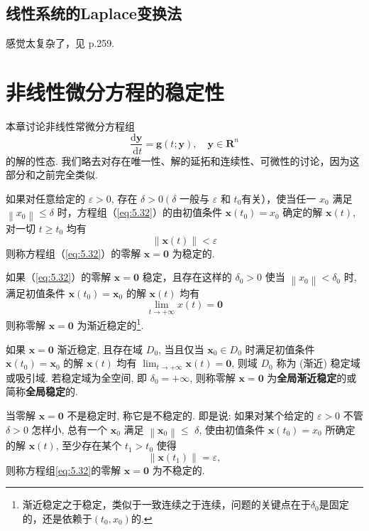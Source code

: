 \subsection{线性系统的Laplace变换法}

感觉太复杂了，见\cite{王高雄} p.259.

\section{非线性微分方程的稳定性}

本章讨论非线性常微分方程组
\begin{equation}\label{eq:5.32}
    \frac{\mathrm{d} \boldsymbol{y}}{\mathrm{~d} t}=\boldsymbol{g}(t ; \boldsymbol{y}), \quad \boldsymbol{y} \in \mathbf{R}^n
\end{equation}
的解的性态. 我们略去对存在唯一性、解的延拓和连续性、可微性的讨论，因为这部分和之前完全类似.

\begin{definition}[稳定与渐近稳定]
    如果对任意给定的 $\varepsilon>0$, 存在 $\delta>0\left(\delta\right.$ 一般与 $\varepsilon$ 和 $t_0$有关），使当任一 $x_0$ 满足 $\left\|x_0\right\| \leqslant \delta$ 时，方程组（\ref{eq:5.32}）的由初值条件 $\boldsymbol{x}\left(t_0\right)=x_0$ 确定的解 $\boldsymbol{x}(t)$, 对一切 $t \geqslant t_0$ 均有
    $$
        \|\boldsymbol{x}(t)\|<\varepsilon
    $$
    则称方程组（\ref{eq:5.32}）的零解 $\boldsymbol{x}=\mathbf{0}$ 为稳定的.

    如果（\ref{eq:5.32}）的零解 $\boldsymbol{x}=\mathbf{0}$ 稳定，且存在这样的 $\delta_0>0$ 使当 $\left\|x_0\right\|<\delta_0$ 时, 满足初值条件 $\boldsymbol{x}\left(t_0\right)=\boldsymbol{x}_0$ 的解 $\boldsymbol{x}(t)$ 均有
    $$
        \lim _{t \rightarrow+\infty} x(t)=\mathbf{0}
    $$
    则称零解 $\boldsymbol{x}=\mathbf{0}$ 为渐近稳定的\footnote{渐近稳定之于稳定，类似于一致连续之于连续，问题的关键点在于$\delta_0$是固定的，还是依赖于$(t_0,x_0)$的.}.
\end{definition}
如果 $\boldsymbol{x}=\mathbf{0}$ 渐近稳定, 且存在域 $D_0$, 当且仅当 $\boldsymbol{x}_0 \in D_0$ 时满足初值条件 $\boldsymbol{x}\left(t_0\right)=\boldsymbol{x}_0$ 的解 $\boldsymbol{x}(t)$ 均有 $\lim _{t \rightarrow+\infty} \boldsymbol{x}(t)=\mathbf{0}$, 则域 $D_0$ 称为 (渐近) 稳定域或吸引域. 若稳定域为全空间, 即 $\delta_0=+\infty$, 则称零解 $\boldsymbol{x}=\mathbf{0}$ 为\textbf{全局渐近稳定}的或简称\textbf{全局稳定}的.

当零解 $\boldsymbol{x}=\mathbf{0}$ 不是稳定时, 称它是不稳定的. 即是说: 如果对某个给定的 $\varepsilon>0$ 不管 $\delta>0$ 怎样小, 总有一个 $\boldsymbol{x}_0$ 满足 $\left\|\boldsymbol{x}_0\right\| \leqslant$ $\delta$, 使由初值条件 $\boldsymbol{x}\left(t_0\right)=x_0$ 所确定的解 $\boldsymbol{x}(t)$, 至少存在某个 $t_1>t_0$ 使得
$$
    \left\|\boldsymbol{x}\left(t_1\right)\right\|=\varepsilon,
$$
则称方程组\ref{eq:5.32}的零解 $\boldsymbol{x}=\mathbf{0}$ 为不稳定的.

